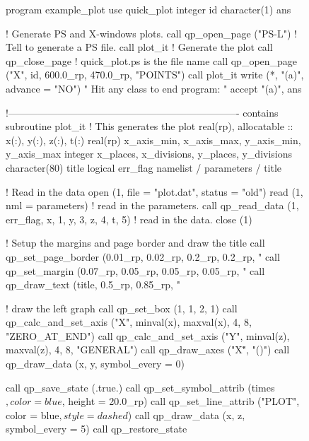 \begin{figure}
\footnotesize
\begin{listing}{1}
  program example_plot
    use quick_plot
    integer id
    character(1) ans
  
  ! Generate PS and X-windows plots.
    call qp_open_page ("PS-L")  ! Tell \quickplot to generate a PS file.
    call plot_it              ! Generate the plot
    call qp_close_page        ! quick_plot.ps is the file name
    call qp_open_page ("X", id, 600.0_rp, 470.0_rp, "POINTS")
    call plot_it
    write (*, "(a)", advance = "NO") " Hit any class to end program: "
    accept "(a)", ans

  !----------------------------------------------------------------------
  contains
  subroutine plot_it                             ! This generates the plot
    real(rp), allocatable :: x(:), y(:), z(:), t(:)
    real(rp) x_axis_min, x_axis_max, y_axis_min, y_axis_max
    integer x_places, x_divisions, y_places, y_divisions
    character(80) title
    logical err_flag
    namelist / parameters / title

  ! Read in the data
    open (1, file = "plot.dat", status = "old")
    read (1, nml = parameters)                  ! read in the parameters.
    call qp_read_data (1, err_flag, x, 1, y, 3, z, 4, t, 5) ! read in the data.
    close (1)

  ! Setup the margins and page border and draw the title
    call qp_set_page_border (0.01_rp, 0.02_rp, 0.2_rp, 0.2_rp, "%
    call qp_set_margin (0.07_rp, 0.05_rp, 0.05_rp, 0.05_rp, "%
    call qp_draw_text (title, 0.5_rp, 0.85_rp, "%

  ! draw the left graph
    call qp_set_box (1, 1, 2, 1)
    call qp_calc_and_set_axis ("X", minval(x), maxval(x), 4, 8, "ZERO_AT_END")
    call qp_calc_and_set_axis ("Y", minval(z), maxval(z), 4, 8, "GENERAL")
    call qp_draw_axes ("X\dlab\u", "\gb(\A)")
    call qp_draw_data (x, y, symbol_every = 0)

    call qp_save_state (.true.)
    call qp_set_symbol_attrib (times$, color = blue$, height = 20.0_rp)
    call qp_set_line_attrib ("PLOT", color = blue$, style = dashed$)
    call qp_draw_data (x, z, symbol_every = 5)
    call qp_restore_state


\end{listing}
\end{figure}
